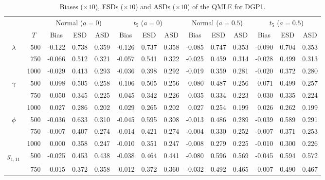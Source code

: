 \begin{table}[htbp]
\centering
\renewcommand{\arraystretch}{1}
\caption{Biases ($\times 10$), ESDs ($\times 10$) and ASDs ($\times 10$) of the QMLE for DGP1.}
\label{tab_DGP1_qmle_x10}
\begin{adjustbox}{width=\textwidth}
\begin{tabular}{crrrrrrrrrrrrr}
\toprule
&       & \multicolumn{3}{c}{Normal ($a=0$)} & \multicolumn{3}{c}{$t_5$ ($a=0$)} & \multicolumn{3}{c}{Normal ($a=0.5$)} & \multicolumn{3}{c}{$t_5$ ($a=0.5$)} \\
\cmidrule(lr){3-5} \cmidrule(lr){6-8} \cmidrule(lr){9-11} \cmidrule(lr){12-14}
& \multicolumn{1}{c}{$T$} & \multicolumn{1}{c}{Bias} & \multicolumn{1}{c}{ESD} & \multicolumn{1}{c}{ASD} & \multicolumn{1}{c}{Bias} & \multicolumn{1}{c}{ESD} & \multicolumn{1}{c}{ASD} & \multicolumn{1}{c}{Bias} & \multicolumn{1}{c}{ESD} & \multicolumn{1}{c}{ASD} & \multicolumn{1}{c}{Bias} & \multicolumn{1}{c}{ESD} & \multicolumn{1}{c}{ASD} \\
\midrule
$\lambda$ & 500 & -0.122 & 0.738 & 0.359 & -0.126 & 0.737 & 0.358 & -0.085 & 0.747 & 0.353 & -0.090 & 0.704 & 0.353 \\
 & 750 & -0.066 & 0.512 & 0.321 & -0.057 & 0.541 & 0.322 & -0.025 & 0.459 & 0.314 & -0.028 & 0.499 & 0.313 \\
 & 1000 & -0.029 & 0.413 & 0.293 & -0.036 & 0.398 & 0.292 & -0.019 & 0.359 & 0.281 & -0.020 & 0.372 & 0.280 \\
$\gamma$ & 500 & 0.098 & 0.505 & 0.258 & 0.106 & 0.505 & 0.256 & 0.080 & 0.487 & 0.256 & 0.071 & 0.499 & 0.257 \\
 & 750 & 0.050 & 0.345 & 0.225 & 0.045 & 0.342 & 0.226 & 0.035 & 0.334 & 0.223 & 0.030 & 0.335 & 0.224 \\
 & 1000 & 0.027 & 0.286 & 0.202 & 0.029 & 0.265 & 0.202 & 0.027 & 0.254 & 0.199 & 0.026 & 0.262 & 0.199 \\
$\phi$ & 500 & -0.036 & 0.633 & 0.310 & -0.045 & 0.595 & 0.308 & -0.013 & 0.486 & 0.289 & -0.039 & 0.589 & 0.291 \\
 & 750 & -0.007 & 0.407 & 0.274 & -0.014 & 0.421 & 0.274 & -0.004 & 0.330 & 0.252 & -0.007 & 0.371 & 0.253 \\
 & 1000 & 0.000 & 0.358 & 0.247 & -0.010 & 0.351 & 0.247 & -0.008 & 0.279 & 0.225 & -0.010 & 0.300 & 0.226 \\
$g_{1,11}$ & 500 & -0.025 & 0.453 & 0.438 & -0.038 & 0.464 & 0.441 & -0.080 & 0.596 & 0.569 & -0.045 & 0.594 & 0.572 \\
 & 750 & -0.015 & 0.372 & 0.358 & -0.012 & 0.372 & 0.360 & -0.032 & 0.492 & 0.465 & -0.007 & 0.490 & 0.467 \\

\end{tabular}
\end{adjustbox}
\end{table}
